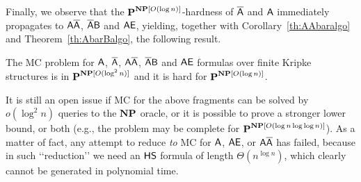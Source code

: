 Finally, we observe that the $\textbf{P}^{\textbf{NP}[O(\log n)]}$-hardness of $\mathsf{\overline{A}}$ and $\mathsf{A}$ immediately propagates to $\mathsf{A\overline{A}}$, $\mathsf{\overline{A}B}$ and $\mathsf{AE}$, yielding, together with Corollary~\ref{th:AAbaralgo} and Theorem~\ref{th:AbarBalgo}, the following result.
%
\begin{theorem}
The MC problem for $\mathsf{A}$, $\mathsf{\overline{A}}$, $\mathsf{A\overline{A}}$, $\mathsf{\overline{A}B}$ and $\mathsf{AE}$ formulas over finite Kripke structures is in $\textbf{P}^{\textbf{NP}[O(\log^2 n)]}$ and it is hard for $\textbf{P}^{\textbf{NP}[O(\log n)]}$.
\end{theorem}

It is still an open issue if MC for the above fragments can be solved by $o(\log^2 n)$ queries to the $\textbf{NP}$ oracle, or it is possible to prove a stronger lower bound, or both (e.g., the problem may be complete for $\textbf{P}^{\textbf{NP}[O(\log n \log\log n)]}$). As a matter of fact, any attempt to reduce \TBSATM{} \emph{to} MC for $\mathsf{A}$, $\mathsf{AE}$, or $\mathsf{A\overline{A}}$ has failed, because in such \lq\lq reduction\rq\rq{} we need an $\text{\sffamily HS}$ formula of length $\Theta(n^{\log n})$, which clearly cannot be generated in polynomial time.